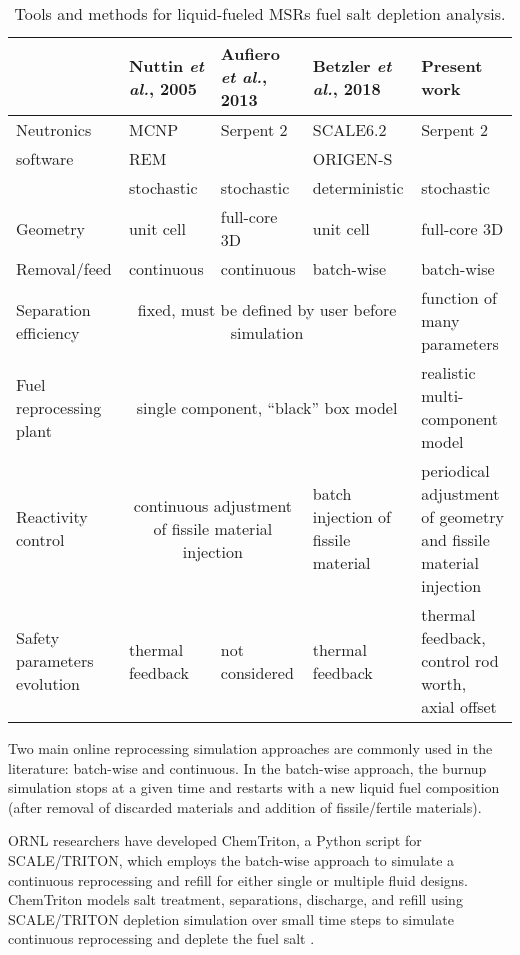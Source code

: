 \begin{table}[htbp]
	\fontsize{9}{11}\selectfont
	\caption{Tools and methods for liquid-fueled \glspl{MSR} fuel salt 	
	depletion analysis.}
	\begin{tabularx}{\textwidth}{p{} p{} 	
	p{} p{} p{}} 
	\hline
	&Nuttin \emph{et al.}, 2005 \cite{nuttin_potential_2005}& Aufiero 
	\emph{et al.}, 2013 \cite{aufiero_extended_2013} & Betzler \emph{et al.}, 
	2018 \cite{betzler_fuel_2018}&Present work \\ \hline
	Neutronics&\gls{MCNP}&Serpent 2 &SCALE6.2     &Serpent 2 \\
	software  & REM      &          &ORIGEN-S     &			       \\
         	  &stochastic&stochastic&deterministic&stochastic      \\[10pt]
	Geometry  & unit cell& full-core 3D&unit cell&full-core 3D\\      [10pt]
	Removal/feed  & continuous &continuous & batch-wise & batch-wise\\[10pt]
	Separation efficiency &\multicolumn{3}{c}{fixed, must be defined by 
	user before simulation} & function of many para\-me\-ters \\ [10pt]
	Fuel reprocessing plant & \multicolumn{3}{c}{single component, 	``black'' 
	box model} & realistic multi-compo\-nent model \\ [10pt]
	Reactivity control & \multicolumn{2}{c}{continuous adjustment of fissile 
	material injection} & batch injection of fissile material & periodical 
		adjustment of geometry and fissile material injection\\ [10pt]
	Safety parameters evolution & thermal feedback & not considered & thermal 
	feedback & thermal feedback, control rod worth, axial offset \\
	\hline
	\end{tabularx}
	\label{tab:msr_codes}
\end{table}

Two main online reprocessing simulation approaches are commonly used in the 
literature: batch-wise and continuous. In the batch-wise approach, the burnup 
simulation stops at a given time and restarts with a new liquid fuel 
composition (after removal of discarded materials and addition of 
fissile/fertile materials). 

\gls{ORNL} researchers have developed ChemTriton, a Python script for
SCALE/TRITON, which employs the batch-wise approach to simulate a continuous 
reprocessing and refill for either single or multiple fluid designs.  
ChemTriton models salt treatment, separations, discharge, and refill using  
SCALE/TRITON depletion simulation over small time steps to simulate continuous 
reprocessing and deplete the fuel salt \cite{betzler_fuel_2018, 
powers_new_2013}.

